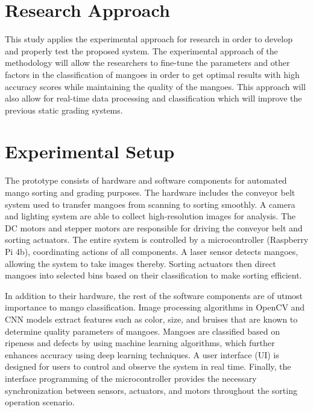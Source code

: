 \section{Research Approach}
This study applies the experimental approach for research in order to develop and properly test the proposed system. The experimental approach of the methodology will allow the researchers to fine-tune the parameters and other factors in the classification of mangoes in order to get optimal results with high accuracy scores while maintaining the quality of the mangoes. This approach will also allow for real-time data processing and classification which will improve the previous static grading systems.

\section{Experimental Setup}
The prototype consists of hardware and software components for automated mango sorting and grading purposes. The hardware includes the conveyor belt system used to transfer mangoes from scanning to sorting smoothly. A camera and lighting system are able to collect high-resolution images for analysis. The DC motors and stepper motors are responsible for driving the conveyor belt and sorting actuators. The entire system is controlled by a microcontroller (Raspberry Pi 4b), coordinating actions of all components. A laser sensor detects mangoes, allowing the system to take images thereby. Sorting actuators then direct mangoes into selected bins based on their classification to make sorting efficient.

In addition to their hardware, the rest of the software components are of utmost importance to mango classification. Image processing algorithms in OpenCV and CNN models extract features such as color, size, and bruises that are known to determine quality parameters of mangoes. Mangoes are classified based on ripeness and defects by using machine learning algorithms, which further enhances accuracy using deep learning techniques. A user interface (UI) is designed for users to control and observe the system in real time. Finally, the interface programming of the microcontroller provides the necessary synchronization between sensors, actuators, and motors throughout the sorting operation scenario.

